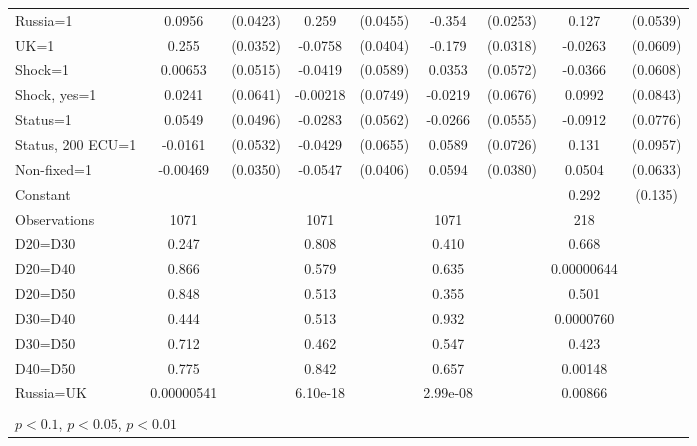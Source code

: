 \begin{tabular}{l|cccccc|cc}
Russia=1        &   0.0956\sym{**} & (0.0423)&    0.259\sym{***}& (0.0455)&   -0.354\sym{***}& (0.0253)&    0.127\sym{**} & (0.0539)\\
UK=1            &    0.255\sym{***}& (0.0352)&  -0.0758\sym{*}  & (0.0404)&   -0.179\sym{***}& (0.0318)&  -0.0263         & (0.0609)\\
Shock=1         &  0.00653         & (0.0515)&  -0.0419         & (0.0589)&   0.0353         & (0.0572)&  -0.0366         & (0.0608)\\
Shock, yes=1    &   0.0241         & (0.0641)& -0.00218         & (0.0749)&  -0.0219         & (0.0676)&   0.0992         & (0.0843)\\
Status=1        &   0.0549         & (0.0496)&  -0.0283         & (0.0562)&  -0.0266         & (0.0555)&  -0.0912         & (0.0776)\\
Status, 200 ECU=1&  -0.0161         & (0.0532)&  -0.0429         & (0.0655)&   0.0589         & (0.0726)&    0.131         & (0.0957)\\
Non-fixed=1     & -0.00469         & (0.0350)&  -0.0547         & (0.0406)&   0.0594         & (0.0380)&   0.0504         & (0.0633)\\
Constant        &                  &         &                  &         &                  &         &    0.292\sym{**} &  (0.135)\\
\hline
Observations    &     1071         &         &     1071         &         &     1071         &         &      218         &         \\
D20=D30         &    0.247         &         &    0.808         &         &    0.410         &         &    0.668         &         \\
D20=D40         &    0.866         &         &    0.579         &         &    0.635         &         &0.00000644         &         \\
D20=D50         &    0.848         &         &    0.513         &         &    0.355         &         &    0.501         &         \\
D30=D40         &    0.444         &         &    0.513         &         &    0.932         &         &0.0000760         &         \\
D30=D50         &    0.712         &         &    0.462         &         &    0.547         &         &    0.423         &         \\
D40=D50         &    0.775         &         &    0.842         &         &    0.657         &         &  0.00148         &         \\
Russia=UK       &0.00000541         &         & 6.10e-18         &         & 2.99e-08         &         &  0.00866         &         \\
\hline\hline
\multicolumn{9}{p{16cm}}{\tiny }\\
\multicolumn{9}{l}{\tiny \sym{*} \(p<0.1\), \sym{**} \(p<0.05\), \sym{***} \(p<0.01\)}\\
\end{tabular}